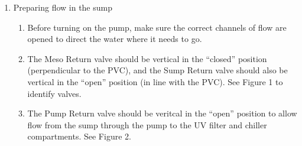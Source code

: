 \documentclass[]{book}
\providecommand{\tightlist}{%
  \setlength{\itemsep}{0pt}\setlength{\parskip}{0pt}}
\begin{document}
\begin{enumerate}
\def\labelenumi{\arabic{enumi}.}
\tightlist
\item
  Preparing flow in the sump

  \begin{enumerate}
  \def\labelenumii{\arabic{enumii}.}
  \tightlist
  \item
    Before turning on the pump, make sure the correct channels of flow
    are opened to direct the water where it needs to go.
  \item
    The Meso Return valve should be vertical in the ``closed'' position
    (perpendicular to the PVC), and the Sump Return valve should also be
    vertical in the ``open'' position (in line with the PVC). See Figure
    1 to identify valves.
  \item
    The Pump Return valve should be veritcal in the ``open'' position to
    allow flow from the sump through the pump to the UV filter and
    chiller compartments. See Figure 2.


\end{enumerate}
\end{enumerate}
\end{document}
